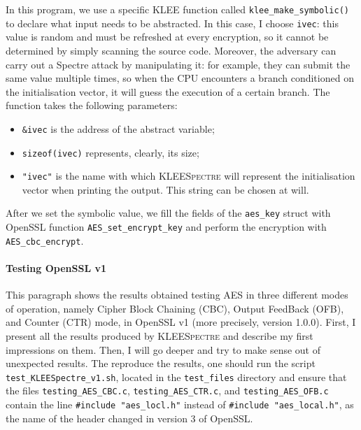 \documentclass[12pt,a4paper]{book}
\theoremstyle{definition}
\begin{document}
	In this program, we use a specific \textsc{KLEE} function called \texttt{klee\_make\_symbolic()} to declare what input needs to be abstracted. In this case, I choose \texttt{ivec}: this value is random and must be refreshed at every encryption, so it cannot be determined by simply scanning the source code. Moreover, the adversary can carry out a Spectre attack by manipulating it: for example, they can submit the same value multiple times, so when the CPU encounters a branch conditioned on the initialisation vector, it will guess the execution of a certain branch. The function takes the following parameters:
	\begin{itemize}
		\item \texttt{\&ivec} is the address of the abstract variable;
		\item \texttt{sizeof(ivec)} represents, clearly, its size;
		\item \texttt{"ivec"} is the name with which \textsc{KLEESpectre} will represent the initialisation vector when printing the output. This string can be chosen at will.
	\end{itemize}
	After we set the symbolic value, we fill the fields of the \texttt{aes\_key} struct with OpenSSL function \texttt{AES\_set\_encrypt\_key} and perform the encryption with \texttt{AES\_cbc\_encrypt}.
	
	\paragraph{Testing OpenSSL v1} This paragraph shows the results obtained testing AES in three different modes of operation, namely Cipher Block Chaining (CBC), Output FeedBack (OFB), and Counter (CTR) mode, in OpenSSL v1 (more precisely, version 1.0.0). First, I present all the results produced by \textsc{KLEESpectre} and describe my first impressions on them. Then, I will go deeper and try to make sense out of unexpected results. 
	The reproduce the results, one should run the script \texttt{test\_KLEESpectre\_v1.sh}, located in the \texttt{test\_files} directory and ensure that the files \texttt{testing\_AES\_CBC.c}, \texttt{testing\_AES\_CTR.c}, and \texttt{testing\_AES\_OFB.c} contain the line \texttt{\#include "aes\_locl.h"} instead of \texttt{\#include "aes\_local.h"}, as the name of the header changed in version 3 of OpenSSL.
	
\end{document}
